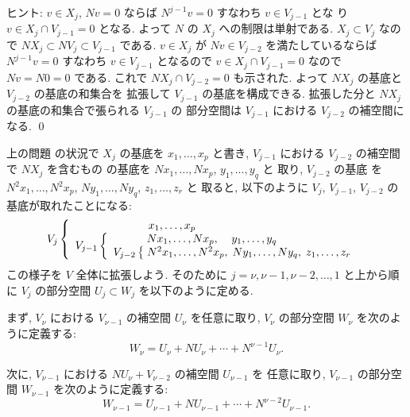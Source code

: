 \documentclass[12pt,twoside]{jarticle}
\begin{document}
\noindent
ヒント: $v\in X_j$, $Nv=0$ ならば $N^{j-1}v=0$ すなわち $v\in V_{j-1}$ とな
り $v\in X_j\cap V_{j-1}=0$ となる. よって $N$ の $X_j$ への制限は単射である.
$X_j\subset V_j$ なので $NX_j\subset NV_j\subset V_{j-1}$ である.
$v\in X_j$ が $Nv\in V_{j-2}$ を満たしているならば $N^{j-1}v=0$ 
すなわち $v\in V_{j-1}$ となるので $v\in X_j\cap V_{j-1}=0$ 
なので $Nv=N0=0$ である.  これで $NX_j\cap V_{j-2}=0$ も示された.
よって $NX_j$ の基底と $V_{j-2}$ の基底の和集合を
拡張して $V_{j-1}$ の基底を構成できる. 
拡張した分と $NX_j$ の基底の和集合で張られる $V_{j-1}$ の
部分空間は $V_{j-1}$ における $V_{j-2}$ の補空間になる.
\qed

\bigskip

上の問題  の状況で $X_j$ の基底を $x_1,\dots,x_p$ と書き, 
$V_{j-1}$ における $V_{j-2}$ の補空間で $NX_j$ を含むもの
の基底を $Nx_1,\dots,Nx_p$, $y_1,\dots,y_q$ と
取り,  $V_{j-2}$ の基底
を $N^2x_1,\dots,N^2x_p$, $Ny_1,\dots,Ny_q$, $z_1,\dots,z_r$ と
取ると, 以下のように $V_j$, $V_{j-1}$, $V_{j-2}$ の基底が取れたことになる:
\begin{equation*}
  V_j
  \left\{
    \begin{array}{l}
      \hphantom{V_{j-1}\{\}} 
      \hphantom{V_{j-2}\{\}}\;\;
            x_1,\dots,x_p \\
      V_{j-1}
      \left\{
        \begin{array}{l}
          \hphantom{V_{j-2}\{\}} 
            Nx_1,\dots,Nx_p,\;\;\;\; y_1,\dots,y_q \\
          V_{j-2}
          \left\{\;
            N^2x_1,\dots,N^2x_p,\; Ny_1,\dots,Ny_q,\; z_1,\dots,z_r
          \right. \\
        \end{array}
      \right. \\
    \end{array}
  \right.
\end{equation*}
この様子を $V$ 全体に拡張しよう.
そのために $j=\nu,\nu-1,\nu-2,\ldots,1$ と上から順に
$V_j$ の部分空間 $U_j\subset W_j$ を以下のように定める.

まず, $V_\nu$ における $V_{\nu-1}$ の補空間 $U_\nu$ を任意に取り, 
$V_\nu$ の部分空間 $W_\nu$ を次のように定義する:
\begin{equation*}
  W_\nu = U_\nu + NU_\nu + \cdots + N^{\nu-1}U_\nu.
\end{equation*}

次に, $V_{\nu-1}$ における $NU_\nu+V_{\nu-2}$ の補空間 $U_{\nu-1}$ を
任意に取り, $V_{\nu-1}$ の部分空間 $W_{\nu-1}$ を次のように定義する:
\begin{equation*}
  W_{\nu-1} = U_{\nu-1} + NU_{\nu-1} + \cdots + N^{\nu-2}U_{\nu-1}.
\end{equation*}
\end{document}
